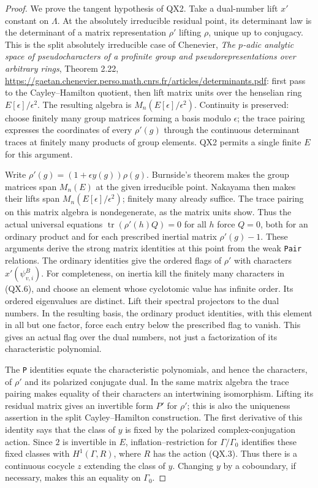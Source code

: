 \begin{proof}
We prove the tangent hypothesis of QX2.  Take a dual-number lift
$x'$ constant on $\Lambda$.  At the absolutely irreducible residual
point, its determinant law is the determinant of a matrix
representation $\rho'$ lifting $\rho$, unique up to conjugacy.
This is the split absolutely irreducible case of Chenevier,
\emph{The $p$-adic analytic space of pseudocharacters of a profinite
group and pseudorepresentations over arbitrary rings}, Theorem 2.22,
\url{https://gaetan.chenevier.perso.math.cnrs.fr/articles/determinants.pdf}:
first pass to the Cayley--Hamilton quotient, then lift matrix units
over the henselian ring $E[\epsilon]/\epsilon^2$.  The resulting
algebra is $M_n(E[\epsilon]/\epsilon^2)$.  Continuity is preserved:
choose finitely many group matrices forming a basis modulo
$\epsilon$; the trace pairing expresses the coordinates of every
$\rho'(g)$ through the continuous determinant traces at finitely
many products of group elements.  QX2 permits a single finite $E$
for this argument.

Write $\rho'(g)=(1+\epsilon y(g))\rho(g)$.  Burnside's theorem
makes the group matrices span $M_n(E)$ at the given irreducible
point.  Nakayama then makes their lifts span
$M_n(E[\epsilon]/\epsilon^2)$; finitely many already suffice.
The trace pairing on this matrix algebra is nondegenerate, as
the matrix units show.  Thus the actual universal equations
$\operatorname{tr}(\rho'(h)Q)=0$ for all $h$ force $Q=0$,
both for an ordinary product and for each prescribed inertial
matrix $\rho'(g)-1$.  These arguments derive the strong matrix
identities at this point from the weak \texttt{Pair} relations.
The ordinary identities give the ordered flags of $\rho'$
with characters $x'(\psi^B_{v,i})$.  For completeness,
on inertia kill the finitely many characters in (QX.6), and choose
an element whose cyclotomic value has infinite order.  Its ordered
eigenvalues are distinct.  Lift their spectral projectors to the
dual numbers.  In the resulting basis, the ordinary product
identities, with this element in all but one factor, force each
entry below the prescribed flag to vanish.  This gives an actual
flag over the dual numbers, not just a factorization of its
characteristic polynomial.

The \texttt{P} identities equate the characteristic polynomials,
and hence the characters, of $\rho'$ and its polarized conjugate
dual.  In the same matrix algebra the trace pairing makes equality
of their characters an intertwining isomorphism.  Lifting its
residual matrix gives an invertible form $P'$ for $\rho'$; this is
also the uniqueness assertion in the split Cayley--Hamilton
construction.  The
first derivative of this identity says that the class of $y$ is
fixed by the polarized complex-conjugation action.  Since $2$ is
invertible in $E$, inflation--restriction for
$\Gamma/\Gamma_0$ identifies these fixed classes with
$H^1(\Gamma,R)$, where $R$ has the action (QX.3).  Thus there is a
continuous cocycle $z$ extending the class of $y$.  Changing $y$
by a coboundary, if necessary, makes this an equality on
$\Gamma_0$.


\end{proof}
